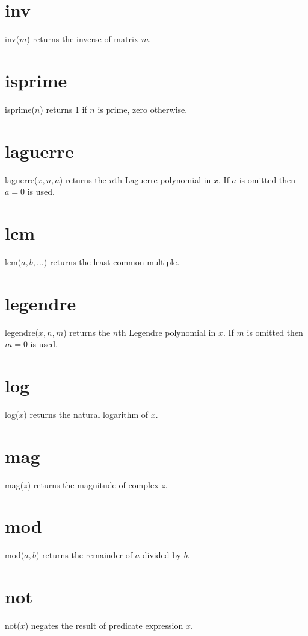\documentclass[12pt,openany]{report}
\begin{document}
\section*{inv}
inv($m$) returns the inverse of matrix $m$.

\section*{isprime}
isprime($n$) returns 1 if $n$ is prime, zero otherwise.

\section*{laguerre}
laguerre($x,n,a$) returns the $n$th Laguerre polynomial in $x$.
If $a$ is omitted then $a=0$ is used.

\section*{lcm}
lcm($a,b,\ldots$) returns the least common multiple.

\section*{legendre}
legendre($x,n,m$) returns the $n$th Legendre polynomial in $x$.
If $m$ is omitted then $m=0$ is used.

\section*{log}
log($x$) returns the natural logarithm of $x$.

\section*{mag}
mag($z$) returns the magnitude of complex $z$.

\section*{mod}
mod($a,b$) returns the remainder of $a$ divided by $b$.

\section*{not}
not($x$) negates the result of predicate expression $x$.
\end{document}
